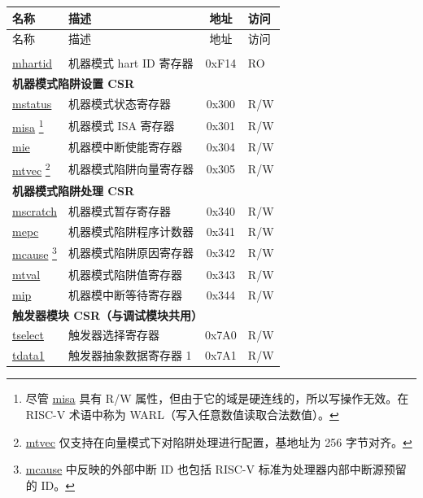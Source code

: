 \begin{longtable}{ | p{4.0cm} | p{8.4cm} | c | l | }
\hline\rowcolor{lightgray}
名称 & 描述 & 地址 & 访问 \\ \hline
\endfirsthead
\hline
\rowcolor{lightgray}
名称 & 描述 & 地址 & 访问 \\
\hline
\endhead
\endfoot

\multicolumn{4}{|l|}{\textbf{机器模式信息 CSR}} \\\hline
\hyperref[regdesc:LPMHARTID]{mhartid} & 机器模式 hart ID 寄存器 & 0xF14 & RO \\\hline
\multicolumn{4}{|l|}{\textbf{机器模式陷阱设置 CSR}} \\\hline
\hyperref[regdesc:LPMSTATUS]{mstatus} & 机器模式状态寄存器 & 0x300 & R/W \\\hline
\hyperref[regdesc:LPMISA]{misa} \footnote{尽管 \hyperref[regdesc:LPMISA]{misa} 具有 R/W 属性，但由于它的域是硬连线的，所以写操作无效。在 RISC-V 术语中称为 WARL（写入任意数值读取合法数值）。} & 机器模式 ISA 寄存器 & 0x301 & R/W \\\hline
\hyperref[regdesc:LPMIE]{mie} & 机器模中断使能寄存器 & 0x304 & R/W \\\hline
\hyperref[regdesc:LPMTVEC]{mtvec} \footnote{\hyperref[regdesc:LPMTVEC]{mtvec} 仅支持在向量模式下对陷阱处理进行配置，基地址为 256 字节对齐。} & 机器模式陷阱向量寄存器 & 0x305 & R/W \\\hline
\multicolumn{4}{|l|}{\textbf{机器模式陷阱处理 CSR}} \\\hline
\hyperref[regdesc:LPMSCRATCH]{mscratch} & 机器模式暂存寄存器 & 0x340 & R/W \\\hline
\hyperref[regdesc:LPMEPC]{mepc} & 机器模式陷阱程序计数器 & 0x341 & R/W \\\hline
\hyperref[regdesc:LPMCAUSE]{mcause} \footnote{\hyperref[regdesc:LPMCAUSE]{mcause} 中反映的外部中断 ID 也包括 RISC-V 标准为处理器内部中断源预留的 ID。} & 机器模式陷阱原因寄存器 & 0x342 & R/W \\\hline
\hyperref[regdesc:LPMTVAL]{mtval} & 机器模式陷阱值寄存器 & 0x343 & R/W \\\hline
\hyperref[regdesc:LPMIP]{mip} & 机器模中断等待寄存器 & 0x344 & R/W \\\hline
\multicolumn{4}{|l|}{\textbf{触发器模块 CSR（与调试模块共用）}} \\\hline
\hyperref[regdesc:LPTSELECT]{tselect} & 触发器选择寄存器 & 0x7A0 & R/W \\\hline
\hyperref[regdesc:LPTDATA1]{tdata1} & 触发器抽象数据寄存器 1  & 0x7A1 & R/W \\\hline

\end{longtable}
